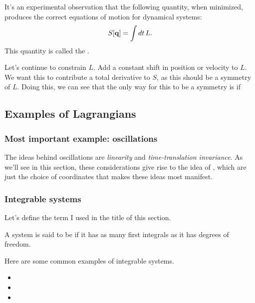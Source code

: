 \documentclass[11pt]{article}
\begin{document}
\begin{iidea}
    It's an experimental observation that the following quantity,
    when minimized, produces the correct equations of motion for 
    dynamical systems:
    \begin{align*}
        S[\mathbf{q}] = \int dt \, L.
    \end{align*}
    This quantity is called the .
\end{iidea}

Let's continue to constrain $L$. Add a constant
shift in position or velocity to $L$. We want this
to contribute a total derivative to $S$, as this should
be a symmetry of $L$. Doing this, we can see that the only
way for this to be a symmetry is if 

\subsection{Examples of Lagrangians}

\subsubsection{Most important example: oscillations}

The ideas behind oscillations are \emph{linearity}
and \emph{time-translation invariance}. As we'll
see in this section, these considerations give rise
to the idea of , which are just the
choice of coordinates that makes these ideas most manifest.

\subsubsection{Integrable systems}

Let's define the term I used in the title of this section.

\begin{ddefinition}
    [Integrability]
    A system is said to be  if it has as
    many first integrals as it has degrees of freedom.
\end{ddefinition}

\begin{eexample}
    Here are some common examples of integrable systems.
    \begin{itemize}
        \item {}
        \item {}
        \item {}
    \end{itemize}
\end{eexample}
\end{document}
